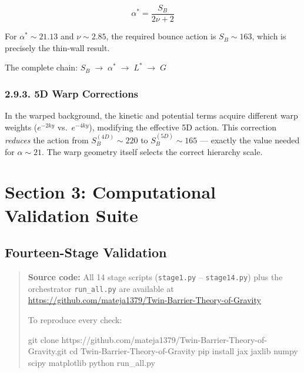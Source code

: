 \documentclass[
  11pt,
]{article}
\newenvironment{Shaded}{}{}
\newcommand{\BuiltInTok}[1]{#1}
\newcommand{\ExtensionTok}[1]{#1}
\newcommand{\FunctionTok}[1]{\textcolor[rgb]{0.02,0.16,0.49}{#1}}
\newcommand{\NormalTok}[1]{#1}
\begin{document}
\[\boxed{\alpha^* = \frac{S_B}{2\nu + 2}} \tag{98}\]

For \(\alpha^* \sim 21.13\) and \(\nu \sim 2.85\), the required bounce
action is \(S_B \sim 163\), which is precisely the thin-wall result.

The complete chain: \(S_B \;\to\; \alpha^* \;\to\; L^* \;\to\; G\)

\hypertarget{d-warp-corrections}{%
\subsubsection{2.9.3. 5D Warp Corrections}\label{d-warp-corrections}}

In the warped background, the kinetic and potential terms acquire
different warp weights (\(e^{-2ky}\) vs.~\(e^{-4ky}\)), modifying the
effective 5D action. This correction \emph{reduces} the action from
\(S_B^{(4D)} \sim 220\) to \(S_B^{(5D)} \sim 165\) --- exactly the value
needed for \(\alpha \sim 21\). The warp geometry itself selects the
correct hierarchy scale.

\bigskip

\hypertarget{section-3-computational-validation-suite}{%
\section{Section 3: Computational Validation
Suite}\label{section-3-computational-validation-suite}}

\hypertarget{fourteen-stage-validation}{%
\subsection{Fourteen-Stage Validation}\label{fourteen-stage-validation}}

\begin{quote}
\textbf{Source code:} All 14 stage scripts (\texttt{stage1.py} --
\texttt{stage14.py}) plus the orchestrator \texttt{run\_all.py} are
available at
\url{https://github.com/mateja1379/Twin-Barrier-Theory-of-Gravity}

To reproduce every check:

\begin{Shaded}
\begin{Highlighting}[]
\FunctionTok{git}\NormalTok{ clone https://github.com/mateja1379/Twin{-}Barrier{-}Theory{-}of{-}Gravity.git}
\BuiltInTok{cd}\NormalTok{ Twin{-}Barrier{-}Theory{-}of{-}Gravity}
\ExtensionTok{pip}\NormalTok{ install jax jaxlib numpy scipy matplotlib}
\ExtensionTok{python}\NormalTok{ run\_all.py}
\end{Highlighting}
\end{Shaded}
\end{quote}
\end{document}
